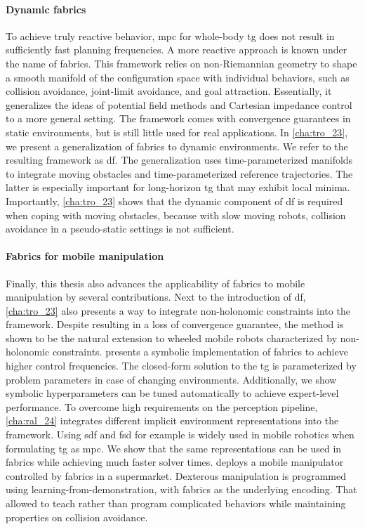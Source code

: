 \paragraph{Dynamic fabrics}
To achieve truly reactive behavior, \ac{mpc} for whole-body \ac{tg} does not
result in sufficiently fast planning frequencies. A more reactive approach is
known under the name of \ac{fabrics}. This framework relies on non-Riemannian
geometry to shape a smooth manifold of the configuration space with individual
behaviors, such as collision avoidance, joint-limit avoidance, and goal 
attraction. Essentially, it generalizes the ideas of potential field methods
and Cartesian impedance control to a more general setting. The framework comes
with convergence guarantees in static environments, but is still little used
for real applications. In \cref{cha:tro_23}, we present a generalization of
\ac{fabrics} to dynamic environments. We refer to the resulting framework as
\ac{df}. The generalization uses time-parameterized manifolds to integrate 
moving obstacles and time-parameterized reference trajectories. The latter is
especially important for long-horizon \ac{tg} that may exhibit local minima.
Importantly, \cref{cha:tro_23} shows that the dynamic component of \ac{df}
is required when coping with moving obstacles, because with slow moving robots,
collision avoidance in a pseudo-static settings is not sufficient.

\paragraph{Fabrics for mobile manipulation}
Finally, this thesis also advances the applicability of \ac{fabrics} to mobile
manipulation by several contributions. 
Next to the introduction of \ac{df}, \cref{cha:tro_23} also presents a way to
integrate non-holonomic constraints into the framework. Despite resulting in a
loss of convergence guarantee, the method is shown to be the natural extension
to wheeled mobile robots characterized by non-holonomic constraints.
 presents a symbolic
implementation of \ac{fabrics} to achieve higher control frequencies. The
closed-form solution to the \ac{tg} is parameterized by problem parameters in
case of changing environments. Additionally, we show symbolic 
hyperparameters can be tuned automatically to achieve expert-level performance.
To overcome high requirements on the perception pipeline, \cref{cha:ral_24}
integrates different implicit environment representations into the framework.
Using \acf{sdf} and \acf{fsd} for example is widely used in mobile robotics when
formulating \ac{tg} as \ac{mpc}. We show that the same representations can be
used in \ac{fabrics} while achieving much faster solver times.
 deploys a mobile manipulator controlled by \ac{fabrics}
in a supermarket. Dexterous manipulation is programmed using
learning-from-demonstration, with \ac{fabrics} as the underlying encoding.
That allowed to teach rather than program complicated behaviors while
maintaining properties on collision avoidance.


